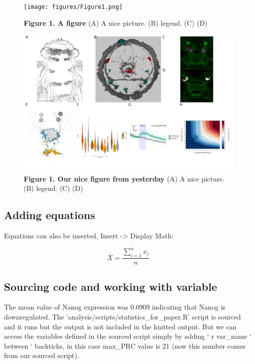\documentclass[
  11pt,
]{article}
\begin{document}
\begin{figure}[H]

{\centering \texttt{[image: figures/Figure1.png]}

}

\caption{\textbf{Figure 1. A figure} (A) A nice picture. (B) legend. (C)
(D)}

\end{figure}%

\begin{figure}[H]

{\centering \includegraphics[width=1\textwidth,height=\textheight]{figures/Figure_complex.png}

}

\caption{\textbf{Figure 1. Our nice figure from yesterday} (A) A nice
picture. (B) legend. (C) (D)}

\end{figure}%

\subsection{Adding equations}\label{adding-equations}

Equations can also be inserted, Insert -\textgreater{} Display Math:

\[
\bar{X} = \frac{\sum_{i=1}^{n} x_{i}}{n}
\]

\hfill\break

\subsection{Sourcing code and working with
variable}\label{sourcing-code-and-working-with-variable}

The mean value of Nanog expression was 0.0909 indicating that Nanog is
downregulated. The `analysis/scripts/statistics\_for\_paper.R' script is
sourced and it runs but the output is not included in the knitted
output. But we can access the variables defined in the sourced script
simply by adding ` r var\_name ` between ` backticks, in this case
max\_PRC value is 21 (now this number comes from our sourced script).
\end{document}
